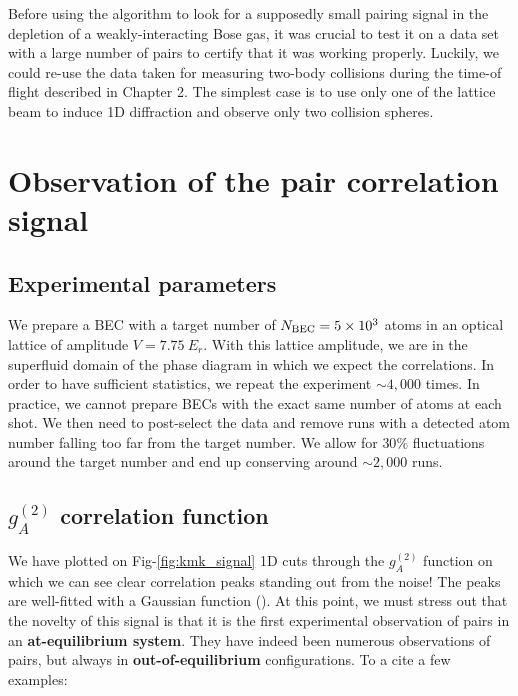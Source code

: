Before using the algorithm to look for a supposedly small \kmk pairing signal in the depletion of a weakly-interacting Bose gas, it was crucial to test it on a data set with a large number of \kmk pairs to certify that it was working properly. Luckily, we could re-use the data taken for measuring two-body collisions during the time-of flight described in Chapter 2. The simplest case is to use only one of the lattice beam to induce 1D diffraction and observe only two collision spheres. 




\section{Observation of the pair correlation signal}

\subsection{Experimental parameters}
\label{sec:post_selec}

We prepare a BEC with a target number of $N_{\rm{BEC}}=5 \times 10^3$ atoms in an optical lattice of amplitude $V=7.75 \ E_r$. With this lattice amplitude, we are in the superfluid domain of the phase diagram in which we expect the \kmk correlations. In order to have sufficient statistics, we repeat the experiment $\sim 4,000$ times. In practice, we cannot prepare BECs with the exact same number of atoms at each shot. We then need to post-select the data and remove runs with a detected atom number falling too far from the target number. We allow for $30 \%$ fluctuations around the target number and end up conserving around $\sim 2,000$ runs.

\subsection{$g^{(2)}_A$ correlation function}

We have plotted on Fig-\ref{fig:kmk_signal} 1D cuts through the $g_{A}^{(2)}$ function on which we can see clear correlation peaks standing out from the noise! The peaks are well-fitted with a Gaussian function (). At this point, we must stress out that the novelty of this signal is that it is the first experimental observation of \kmk pairs in an \textbf{at-equilibrium system}. They have indeed been numerous observations of \kmk pairs, but always in \textbf{out-of-equilibrium} configurations. To a cite a few examples:

